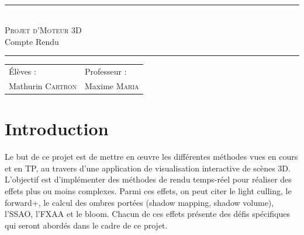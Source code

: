 \documentclass[10pt,a4paper]{article}
\author{\me}
\title{\titre}
\date{\today}
\newcommand{\HRule}{\rule{\linewidth}{0.5mm}}
\newcommand{\me}{Mathurin \textsc{Cartron}}
\newcommand{\prof}{Maxime \textsc{Maria}}
\newcommand{\matiere}{Moteur 3D}
\newcommand{\Cusrus}{Master ISICG/CRYPTIS}
\newcommand{\Prog}{Semestre 1}
\newcommand{\titre}{Projet d'\matiere}
\newcommand{\soustitre}{Compte Rendu}
\begin{document}
%
%

	\begin{titlepage}
		\enlargethispage{2cm}
		\begin{center}
			\\
			\vspace*{1cm}
			\HRule\\
				\vspace*{.5cm}
				\textsc{\LARGE{\titre}}\\
				\vspace*{.7cm}
				\Large{\soustitre}\\
				\vspace*{.2cm}
			\HRule
			\vspace*{.7cm}
			\begin{tabular}{D{7cm} G{7cm}}
				Élèves :  	&  Professeur : \\
				\me 		&  \prof  \\
			\end{tabular}
		\end{center}
		\vspace*{.7cm}
		\begin{multicols}{2}
			\tableofcontents
			\listoftables
			\listoffigures
		\end{multicols}
		\vspace*{4cm}
	\end{titlepage}

\ClearShipoutPicture

%
%

\section{Introduction}
	Le but de ce projet est de mettre en œuvre les différentes méthodes vues en cours et en TP, au travers d'une application de visualisation interactive de scènes 3D. L'objectif est d'implémenter des méthodes de rendu temps-réel pour réaliser des effets plus ou moins complexes. Parmi ces effets, on peut citer le light culling, le forward+, le calcul des ombres portées (shadow mapping, shadow volume), l'SSAO, l'FXAA et le bloom. Chacun de ces effets présente des défis spécifiques qui seront abordés dans le cadre de ce projet.
\end{document}
